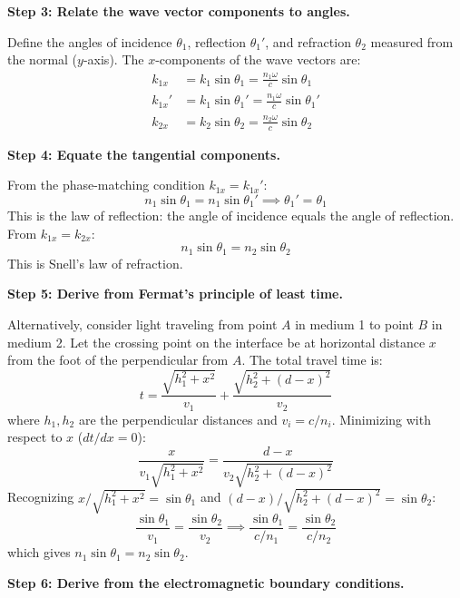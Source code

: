 \textbf{Step 3: Relate the wave vector components to angles.}

Define the angles of incidence $\theta_1$, reflection $\theta_1'$, and refraction $\theta_2$ measured from the normal ($y$-axis). The $x$-components of the wave vectors are:
\begin{align}
k_{1x} &= k_1\sin\theta_1 = \frac{n_1\omega}{c}\sin\theta_1 \\
k_{1x}' &= k_1\sin\theta_1' = \frac{n_1\omega}{c}\sin\theta_1' \\
k_{2x} &= k_2\sin\theta_2 = \frac{n_2\omega}{c}\sin\theta_2
\end{align}

\textbf{Step 4: Equate the tangential components.}

From the phase-matching condition $k_{1x} = k_{1x}'$:
\begin{equation}
n_1\sin\theta_1 = n_1\sin\theta_1' \implies \theta_1' = \theta_1
\end{equation}
This is the law of reflection: the angle of incidence equals the angle of reflection. From $k_{1x} = k_{2x}$:
\begin{equation}
n_1\sin\theta_1 = n_2\sin\theta_2
\end{equation}
This is Snell's law of refraction.

\textbf{Step 5: Derive from Fermat's principle of least time.}

Alternatively, consider light traveling from point $A$ in medium 1 to point $B$ in medium 2. Let the crossing point on the interface be at horizontal distance $x$ from the foot of the perpendicular from $A$. The total travel time is:
\begin{equation}
t = \frac{\sqrt{h_1^2 + x^2}}{v_1} + \frac{\sqrt{h_2^2 + (d-x)^2}}{v_2}
\end{equation}
where $h_1, h_2$ are the perpendicular distances and $v_i = c/n_i$. Minimizing with respect to $x$ ($dt/dx = 0$):
\begin{equation}
\frac{x}{v_1\sqrt{h_1^2+x^2}} = \frac{d-x}{v_2\sqrt{h_2^2+(d-x)^2}}
\end{equation}
Recognizing $x/\sqrt{h_1^2+x^2} = \sin\theta_1$ and $(d-x)/\sqrt{h_2^2+(d-x)^2} = \sin\theta_2$:
\begin{equation}
\frac{\sin\theta_1}{v_1} = \frac{\sin\theta_2}{v_2} \implies \frac{\sin\theta_1}{c/n_1} = \frac{\sin\theta_2}{c/n_2}
\end{equation}
which gives $n_1\sin\theta_1 = n_2\sin\theta_2$.

\textbf{Step 6: Derive from the electromagnetic boundary conditions.}

